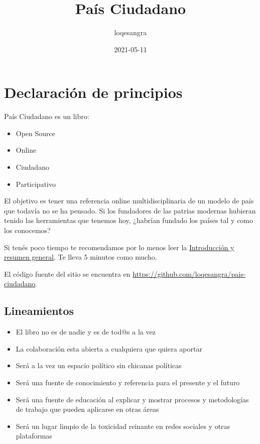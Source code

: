 \documentclass[
]{book}
\title{País Ciudadano}
\author{loqesangra}
\date{2021-05-11}
\providecommand{\tightlist}{%
  \setlength{\itemsep}{0pt}\setlength{\parskip}{0pt}}
\begin{document}
\maketitle

{
\setcounter{tocdepth}{1}
\tableofcontents
}
\hypertarget{declaraciuxf3n-de-principios}{%
\chapter{Declaración de principios}\label{declaraciuxf3n-de-principios}}

País Ciudadano es un libro:

\begin{itemize}
\tightlist
\item
  Open Source
\item
  Online
\item
  Ciudadano
\item
  Participativo
\end{itemize}

El objetivo es tener una referencia online multidisciplinaria de un modelo de país que todavía no se ha pensado. Si los fundadores de las patrias modernas hubieran tenido las herramientas que tenemos hoy, ¿habrían fundado los países tal y como los conocemos?

Si tenés poco tiempo te recomendamos por lo menos leer la \protect\hyperlink{intro}{Introducción y resumen general}. Te lleva 5 minutos como mucho.

El código fuente del sitio se encuentra en \url{https://github.com/loqesangra/pais-ciudadano}.

\hypertarget{lineamientos}{%
\section{Lineamientos}\label{lineamientos}}

\begin{itemize}
\tightlist
\item
  El libro no es de nadie y es de tod@s a la vez
\item
  La colaboración esta abierta a cualquiera que quiera aportar
\item
  Será a la vez un espacio político sin chicanas políticas
\item
  Será una fuente de conocimiento y referencia para el presente y el futuro
\item
  Será una fuente de educación al explicar y mostrar procesos y metodologías de trabajo que pueden aplicarse en otras áreas
\item
  Será un lugar limpio de la toxicidad reinante en redes sociales y otras plataformas
\end{itemize}
\end{document}
